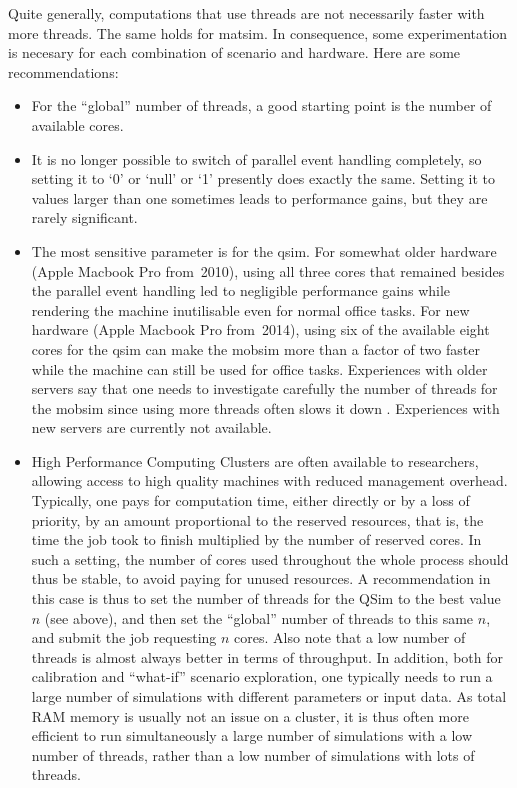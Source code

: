 Quite generally, computations that use threads are not necessarily faster with more threads. The same holds for \gls{matsim}.  In consequence, some experimentation is necesary for each combination of scenario and hardware.  Here are some recommendations:
\begin{itemize}\styleItemize

\item For the ``global'' number of threads, a good starting point is the number of available cores.

\item It is no longer possible to switch of parallel event handling completely, so setting it to `0' or `null' or `1' presently does exactly the same.  Setting it to values larger than one sometimes leads to performance gains, but they are rarely significant.

\item The most sensitive parameter is for the \gls{qsim}.
  For somewhat older hardware (\eg Apple Macbook Pro from~2010), using all three cores that remained besides the parallel event handling led to negligible performance gains while rendering the machine inutilisable even for normal office tasks.
  For new hardware (\eg Apple Macbook Pro from~2014), using six of the available eight cores for the \gls{qsim} can make the \gls{mobsim} more than a factor of two faster while the machine can still be used for office tasks.
  Experiences with older servers say that one needs to investigate carefully the number of threads for the \gls{mobsim} since using more threads often slows it down \citep{Dobler_PhDThesis_2013}.
  Experiences with new servers are currently not available.  
  \item High Performance Computing Clusters are often available to researchers, allowing access to high quality machines with reduced management overhead. Typically, one pays for computation time, either directly or by a loss of priority, by an amount proportional to the reserved resources, that is, the time the job took to finish multiplied by the number of reserved cores. In such a setting, the number of cores used throughout the whole process should thus be stable, to avoid paying for unused resources. A recommendation in this case is thus to set the number of threads for the QSim to the best value $n$ (see above), and then set the ``global'' number of threads to this same $n$, and submit the job requesting $n$ cores.
	  Also note that a low number of threads is almost always better in terms of throughput.
	  In addition, both for calibration and ``what-if'' scenario exploration,
	  one typically needs to run a large number of simulations with different parameters or
	  input data.
	  As total RAM memory is usually not an issue on a cluster,
	  it is thus often more efficient to run simultaneously a large number of simulations
	  with a low number of threads, rather than a low number of simulations with lots of threads.

\end{itemize}

